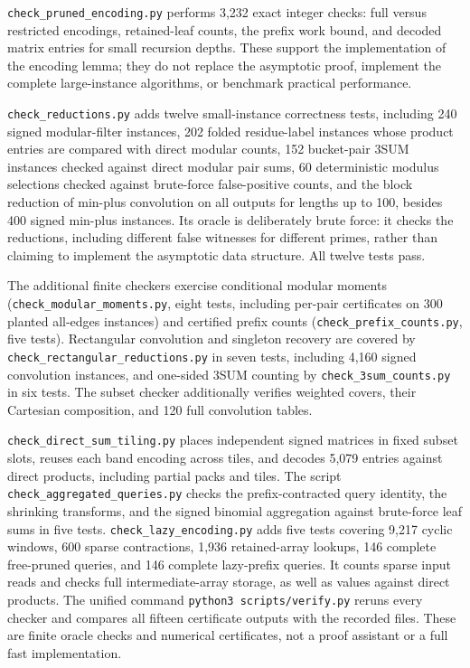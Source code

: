 \documentclass[11pt]{article}
\begin{document}
\texttt{check\_pruned\_encoding.py} performs 3,232 exact integer checks:
full versus restricted encodings, retained-leaf counts, the prefix work
bound, and decoded matrix entries for small recursion depths. These support
the implementation of the encoding lemma; they do not replace the
asymptotic proof, implement the complete large-instance algorithms, or
benchmark practical performance.

\texttt{check\_reductions.py} adds twelve small-instance correctness tests,
including 240 signed modular-filter instances, 202 folded residue-label
instances whose product entries are compared with direct modular counts,
152 bucket-pair 3SUM instances checked against direct modular pair sums,
60 deterministic modulus selections checked against brute-force
false-positive counts, and the block reduction of min-plus convolution on
all outputs for lengths up to 100, besides 400 signed min-plus instances. Its oracle is deliberately brute force: it
checks the reductions, including different false witnesses for different
primes, rather than claiming to implement the asymptotic data structure.
All twelve tests pass.

The additional finite checkers exercise conditional modular moments
(\texttt{check\_modular\_moments.py}, eight tests, including per-pair
certificates on 300 planted all-edges instances) and certified prefix
counts (\texttt{check\_prefix\_counts.py}, five tests).
Rectangular convolution and singleton recovery are covered by
\texttt{check\_rectangular\_reductions.py} in seven tests, including
4,160 signed convolution instances, and one-sided 3SUM counting by
\texttt{check\_3sum\_counts.py} in six tests.
The subset checker additionally verifies weighted covers, their Cartesian
composition, and 120 full convolution tables.

\texttt{check\_direct\_sum\_tiling.py} places independent signed matrices in
fixed subset slots, reuses each band encoding across tiles, and decodes 5,079
entries against direct products, including partial packs and tiles. The
script \texttt{check\_aggregated\_\allowbreak queries.py} checks the
prefix-contracted query identity, the shrinking transforms, and the signed binomial aggregation
against brute-force leaf sums in five tests.
\texttt{check\_lazy\_encoding.py} adds five tests covering 9,217 cyclic
windows, 600 sparse contractions, 1,936 retained-array lookups, 146
complete free-pruned queries, and 146 complete lazy-prefix queries. It
counts sparse input reads and checks full intermediate-array storage,
as well as values against direct products. The unified command
\texttt{python3 scripts/verify.py} reruns every checker and compares all fifteen
certificate outputs with the recorded files. These are finite oracle
checks and numerical certificates, not a proof assistant or a full fast
implementation.
\end{document}
